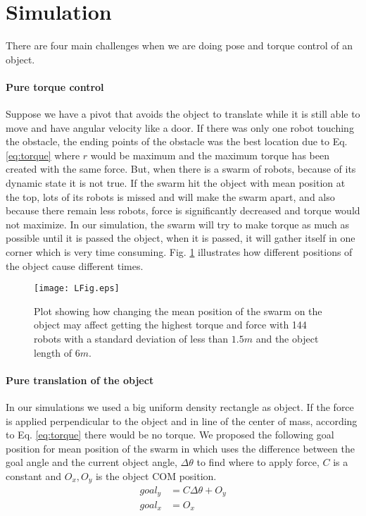 
\section{Simulation}\label{sec:simulation}
There are four main challenges when we are doing pose and torque control of an object. 
\paragraph{Pure torque control} 
Suppose we have a pivot that avoids the object to translate while it is still able to move and have angular velocity like a door. If there was only one robot touching the obstacle, the ending points of the obstacle was the best location due to Eq. \ref{eq:torque} where $r$ would be maximum and the maximum torque has been created with the same force. But, when there is a swarm of robots, because of its dynamic state it is not true. If the swarm hit the object with mean position at the top, lots of its robots is missed and will make the swarm apart, and also because there remain less robots, force is significantly decreased and torque would not maximize. In our simulation, the swarm will try to make torque as much as possible until it is passed the object, when it is passed, it will gather itself in one corner which is very time consuming. Fig. \ref{fig:LFig} illustrates how different positions of the object cause different times. 

\begin{figure}
\begin{center}
	\texttt{[image: LFig.eps]}
\end{center}
\vspace{-1em}
\caption{\label{fig:LFig}
Plot showing how changing the mean position of the swarm on the object may affect getting the highest torque and force with 144 robots with a standard deviation of less than $1.5 m$ and the object length of $6m$.
}
\vspace{-1em}
\end{figure}
\paragraph{Pure translation of the object}
In our simulations we used a big uniform density rectangle as object. If the force is applied perpendicular to the object and in line of the center of mass, according to Eq. \ref{eq:torque} there would be no torque. We proposed the following goal position for mean position of the swarm in which uses the difference between the goal angle and the current object angle, $\Delta \theta$ to find where to apply force, $C$ is a constant and $O_x,O_y$ is the object COM position.
\begin{align}\nonumber
goal_y &= C \Delta \theta + O_y\\
goal_x &= O_x
\end{align}

